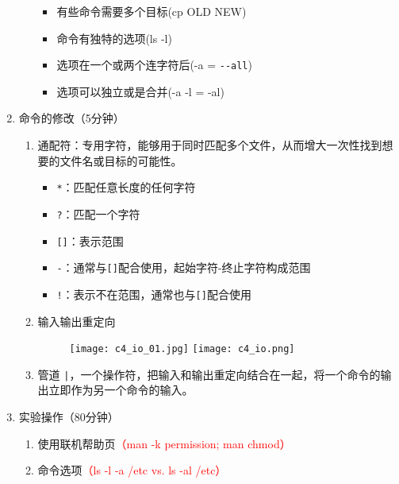 \documentclass{TIJMUjiaoanSY}
\begin{document}
\begin{enumerate}
\begin{enumerate}
\begin{itemize}
	  \item 有些命令需要多个目标(cp OLD NEW)
	  \item 命令有独特的选项(ls -l)
	  \item 选项在一个或两个连字符后(-a = \verb|--all|)
	  \item 选项可以独立或是合并(-a -l = -al)
        \end{itemize}
    \end{enumerate}
  \item 命令的修改（5分钟）
    \begin{enumerate}
      \item 通配符：专用字符，能够用于同时匹配多个文件，从而增大一次性找到想要的文件名或目标的可能性。
	\begin{itemize}
	  \item \verb|*|：匹配任意长度的任何字符
	  \item \verb|?|：匹配一个字符
	  \item \verb|[]|：表示范围
	  \item \verb|-|：通常与\verb|[]|配合使用，起始字符-终止字符构成范围
	  \item \verb|!|：表示不在范围，通常也与\verb|[]|配合使用
	\end{itemize}
      \item 输入输出重定向
	\vspace*{-10pt}
	\begin{figure}[h]
	  \centering
	  \texttt{[image: c4\_io\_01.jpg]}
	  \quad
	  \texttt{[image: c4\_io.png]}
	\end{figure}
	\vspace*{-10pt}
      \item 管道
	\verb=|=，一个操作符，把输入和输出重定向结合在一起，将一个命令的输出立即作为另一个命令的输入。
    \end{enumerate}
  \item 实验操作（80分钟）
    \begin{enumerate}
      \item 使用联机帮助页\textcolor{red}{（man -k permission; man chmod）}
      \item 命令选项\textcolor{red}{（ls -l -a /etc vs. ls -al /etc）}

\otherTail
\newpage
\otherHeader


\end{enumerate}
\end{enumerate}
\end{document}
